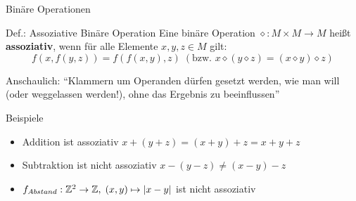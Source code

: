 \begin{frame}{Binäre Operationen}
	\begin{block}{Def.: Assoziative Binäre Operation}
		Eine binäre Operation $\diamond:M \times M \to M$  heißt \textbf{assoziativ}, wenn für alle Elemente $x,y,z \in M$ gilt: 
		\medskip
		\[f(x,f(y,z)) = f(f(x,y),z) \; (\text{bzw. } x \diamond (y \diamond z) = (x \diamond y) \diamond z )\]

		\medskip
		Anschaulich: \enquote{Klammern um Operanden dürfen gesetzt werden, wie man will (oder weggelassen werden!), ohne das Ergebnis zu beeinflussen}
	\end{block}

	\begin{exampleblock}{Beispiele}
		\begin{itemize}
			\item Addition ist assoziativ $x + (y + z) = (x + y) + z = x + y + z$
			\item Subtraktion ist nicht assoziativ $x - (y - z) \ne (x - y) - z$ 
			\item $f_{Abstand}: \mathbb{Z}^2 \to \mathbb{Z}, \; (x,y) \mapsto |x-y|$ ist nicht assoziativ
		\end{itemize}
	\end{exampleblock}
\end{frame}
